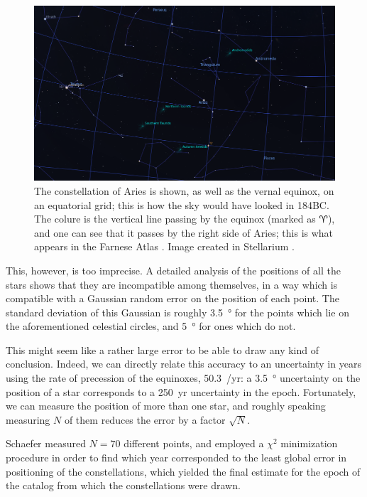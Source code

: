 \documentclass[main.tex]{subfiles}
\begin{document}
\begin{figure}[ht]
\centering
\includegraphics[width=\textwidth]{figures/aries_on_colure_184_BC.png}
\caption{The constellation of Aries is shown, as well as the vernal equinox, on an equatorial grid; this is how the sky would have looked in 184BC. The colure is the vertical line passing by the equinox (marked as \(\aries\)), and one can see that it passes by the right side of Aries; this is what appears in the Farnese Atlas \cite[fig.\ 2]{schaeferEpochConstellationsFarnese2005}. Image created in Stellarium \cite[]{stellariumcontributorsStellariumAstronomySoftware2020}.}
\label{fig:aries}
\end{figure}

This, however, is too imprecise. A detailed analysis of the positions of all the stars shows that they are incompatible among themselves, in a way which is compatible with a Gaussian random error on the position of each point. The standard deviation of this Gaussian is roughly \SI{3.5}{\degree} for the points which lie on the aforementioned celestial circles, and \SI{5}{\degree} for ones which do not. 

This might seem like a rather large error to be able to draw any kind of conclusion.
Indeed, we can directly relate this accuracy to an uncertainty in years using the rate of precession of the equinoxes, \SI{50.3}{\arcsec / yr}: a \SI{3.5}{\degree} uncertainty on the position of a star corresponds to a \SI{250}{yr} uncertainty in the epoch. 
Fortunately, we can measure the position of more than one star, and roughly speaking measuring \(N\) of them reduces the error by a factor \(\sqrt{N}\). 

Schaefer measured \(N = 70\) different points, and employed a \(\chi^2\) minimization procedure in order to find which year corresponded to the least global error in positioning of the constellations, which yielded the final estimate for the epoch of the catalog from which the constellations were drawn. 
\end{document}
